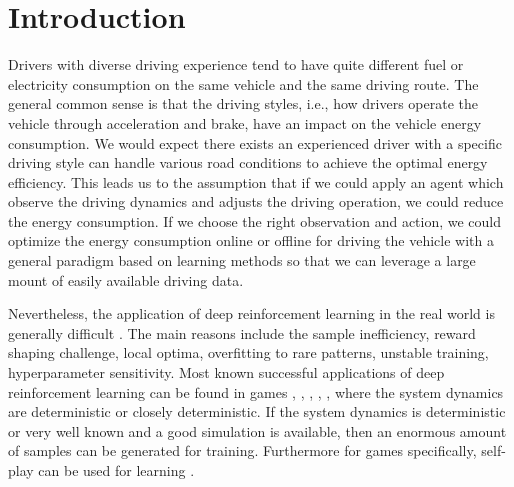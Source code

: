 \documentclass[conference]{IEEEtran}
\begin{document}
\section{Introduction}

Drivers with diverse driving experience tend to have quite different fuel or electricity consumption on the same vehicle and the same driving route. The general common sense is that the driving styles, i.e., how drivers operate the vehicle through acceleration and brake, have an impact on the vehicle energy consumption. We would expect there exists an experienced driver with a specific driving style can handle various road conditions to achieve the optimal energy efficiency. This leads us to the assumption that if we could apply an agent which observe the driving dynamics and adjusts the driving operation, we could reduce the energy consumption. If we choose the right observation and action, we could optimize the energy consumption online or offline for driving the vehicle with a general paradigm based on learning methods so that we can leverage a large mount of easily available driving data.

Nevertheless, the application of deep reinforcement learning in the real world is generally difficult \parencite{DulacArnold_2021_real_world_rl}. The main reasons include the sample inefficiency, reward shaping challenge, local optima, overfitting to rare patterns, unstable training, hyperparameter sensitivity. Most known successful applications of deep reinforcement learning can be found in games \parencite{mnih13:_playin_atari_deep_reinf_learn}, \parencite{DBLP:journals/nature/SilverHMGSDSAPL16}, \parencite{DBLP:conf/ijcai/BrownS17}, \parencite{openai19:_dota_large_scale_deep_reinf_learn}, \parencite{bakhtin22:_Human_level_diplomacy_cicero}, where the system dynamics are deterministic or closely deterministic.
If the system dynamics is deterministic or very well known and a good simulation is available, then an enormous amount of samples can be generated for training. Furthermore for games specifically, self-play can be used for learning \parencite{Silver_2018}.
\end{document}
